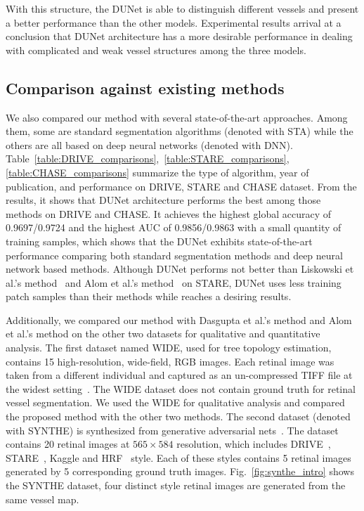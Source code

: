 \documentclass[journal]{IEEEtran}
\begin{document}
With this structure, the DUNet is able to distinguish different vessels and present a better performance than the other models. Experimental results arrival at a conclusion that DUNet architecture has a more desirable performance in dealing with complicated and weak vessel structures among the three models.

\subsection{Comparison against existing methods}
We also compared our method with several state-of-the-art approaches. Among them, some are standard segmentation algorithms (denoted with STA) while the others are all based on deep neural networks (denoted with DNN). Table~\ref{table:DRIVE_comparisons},~\ref{table:STARE_comparisons}, \ref{table:CHASE_comparisons} summarize the type of algorithm, year of publication, and performance on DRIVE, STARE and CHASE dataset. From the results, it shows that DUNet architecture performs the best among those methods on DRIVE and CHASE. It achieves the highest global accuracy of 0.9697/0.9724 and the highest AUC of 0.9856/0.9863 with a small quantity of training samples, which shows that the DUNet exhibits state-of-the-art performance comparing both standard segmentation methods and deep neural network based methods. Although DUNet performs not better than Liskowski et al.'s method~\cite{liskowski_segmenting_2016} and Alom et al.'s method~\cite{alom_recurrent_2018} on STARE, DUNet uses less training patch samples than their methods while reaches a desiring results.

Additionally, we compared our method with  Dasgupta et al.'s method and Alom et al.'s method on the other two datasets for qualitative and quantitative analysis. The first dataset named WIDE, used for tree topology estimation, contains 15 high-resolution, wide-field, RGB images. Each retinal image was taken from a different individual and captured as an un-compressed TIFF file at the widest setting~\cite{Estrada2015Tree}. The WIDE dataset does not contain ground truth for retinal vessel segmentation. We used the WIDE for qualitative analysis and compared the proposed method with the other two methods. The second dataset (denoted with SYNTHE) is synthesized from generative adversarial nets~\cite{zhao2018synthesizing}. The dataset contains 20 retinal images at $565 \times 584$ resolution, which includes DRIVE~\cite{staal_ridge-based_2004}, STARE~\cite{hoover_locating_1998}, Kaggle and HRF~\cite{Kohler2013Automatic} style. Each of these styles contains 5 retinal images generated by 5 corresponding ground truth images. Fig.~\ref{fig:synthe_intro} shows the SYNTHE dataset, four distinct style retinal images are generated from the same vessel map.
\end{document}

